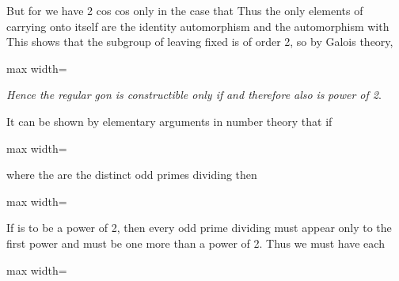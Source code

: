 \documentclass[11pt,oneside]{article}
\begin{document}
\begin{BookBody}
\noindent But for  we have 2 cos cos only in the case that  Thus the only elements of  carrying  onto itself are the identity automorphism and the automorphism \BookInline{\tau,\allowbreak } with  This shows that the subgroup of  leaving  fixed is of order 2, so by Galois theory,

\begin{center}\begin{adjustbox}{max width=\linewidth}\end{adjustbox}\end{center}

\noindent \textit{Hence the regular} \textit{gon is constructible only if}  \textit{and therefore also}  \textit{is}  \textit{power of 2}.

It can be shown by elementary arguments in number theory that if

\begin{center}\begin{adjustbox}{max width=\linewidth}\end{adjustbox}\end{center}

\noindent where the  are the distinct odd primes dividing  then

\begin{center}\begin{adjustbox}{max width=\linewidth}\end{adjustbox}\end{center}

\noindent If  is to be a power of 2, then every odd prime dividing  must appear only to the first power and must be one more than a power of 2. Thus we must have each

\begin{center}\begin{adjustbox}{max width=\linewidth}\end{adjustbox}\end{center}


\end{BookBody}
\end{document}
